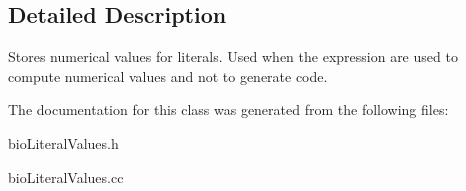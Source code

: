 \subsection{Detailed Description}
Stores numerical values for literals. Used when the expression are used to compute numerical values and not to generate code. 

The documentation for this class was generated from the following files\+:\begin{DoxyCompactItemize}
\item 
bio\+Literal\+Values.\+h\item 
bio\+Literal\+Values.\+cc\end{DoxyCompactItemize}

